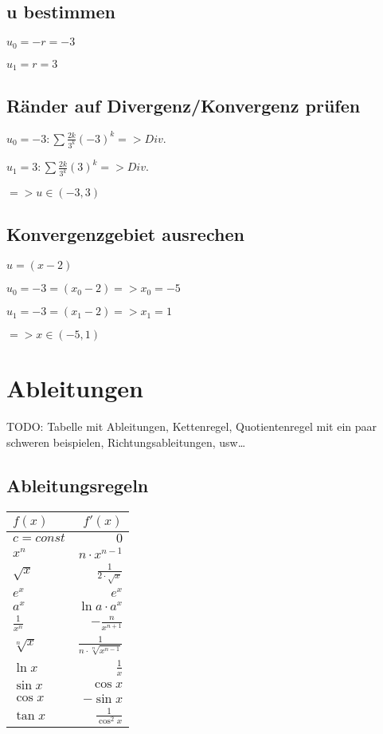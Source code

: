 \documentclass[a4paper, 11pt]{article}
\begin{document}
\subsection { u bestimmen}

$u_0 = -r = -3$

$u_1 =  r = 3$

\subsection { Ränder auf Divergenz/Konvergenz prüfen}

$u_0 = -3: \sum \frac{2k} {3^k} (-3)^k => Div.$

$u_1 = 3: \sum \frac{2k} {3^k} (3)^k => Div.$    

$=> u \in (-3, 3)$

\subsection { Konvergenzgebiet ausrechen}

$u = (x - 2)$

$u_0 = -3 = (x_0 - 2) => x_0 = -5$

$u_1 = -3 = (x_1 - 2) => x_1 = 1$

$=> x \in (-5, 1)$ 


\section{Ableitungen}

TODO: Tabelle mit Ableitungen, Kettenregel, Quotientenregel mit ein paar
schweren beispielen, Richtungsableitungen, usw\ldots 
\subsection{Ableitungsregeln}
\renewcommand{\arraystretch}{1.5}

\begin{tabular}{l | r} 
	$f(x)$ & $f'(x)$\\
	\hline 
	$c = const$ & $0$\\
	$x^n$ & $n \cdot x^{n-1}$\\
	$\sqrt{x}$ & $\frac{1}{2\cdot\sqrt{x}}$\\
	$e^x$ & $e^x$\\
	$a^x$ & $\ln{a} \cdot a^x$\\
	$\frac{1}{x^n}$ & $- \frac{n}{x^{n+1}}$\\
	$\sqrt[n]{x}$ & $\frac{1}{n \cdot \sqrt[n]{x^{n-1}}}$\\
	$\ln{x}$ & $\frac{1}{x}$\\
	$\sin{x}$ & $\cos{x}$\\
	$\cos{x}$ & $-\sin{x}$\\
	$\tan{x}$ & $\frac{1}{\cos^2{x}}$\\
\end{tabular} \newpage
\end{document}
